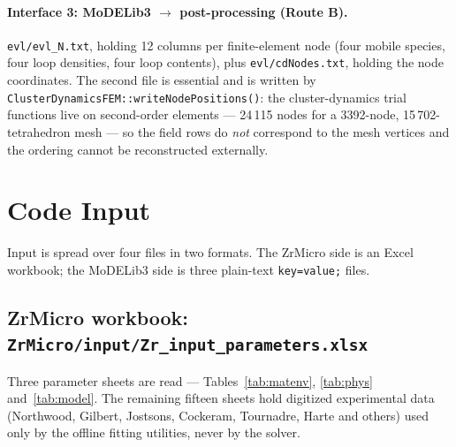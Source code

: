 \documentclass[11pt]{article}
\newcommand{\ZrM}{\textsf{ZrMicro}}
\newcommand{\MoD}{\textsf{MoDELib3}}
\newcommand{\code}[1]{\texttt{\small #1}}
\newcommand{\file}[1]{\texttt{\footnotesize #1}}
\begin{document}
\paragraph*{Interface 3: \MoD{} $\rightarrow$ post-processing (Route B).}
\file{evl/evl\_N.txt}, holding 12 columns per finite-element node (four mobile
species, four loop densities, four loop contents), plus \file{evl/cdNodes.txt},
holding the node coordinates. The second file is essential and is written by
\code{ClusterDynamicsFEM::writeNodePositions()}: the cluster-dynamics trial
functions live on second-order elements --- 24\,115 nodes for a 3392-node,
15\,702-tetrahedron mesh --- so the field rows do \emph{not} correspond to the
mesh vertices and the ordering cannot be reconstructed externally.

\section{Code Input}
\label{sec:input}

Input is spread over four files in two formats. The \ZrM{} side is an Excel
workbook; the \MoD{} side is three plain-text \code{key=value;} files.

\subsection{\ZrM{} workbook: \file{ZrMicro/input/Zr\_input\_parameters.xlsx}}

Three parameter sheets are read --- Tables~\ref{tab:matenv}, \ref{tab:phys}
and~\ref{tab:model}. The remaining fifteen sheets hold digitized experimental
data (Northwood, Gilbert, Jostsons, Cockeram, Tournadre, Harte and others) used
only by the offline fitting utilities, never by the solver.
\end{document}
